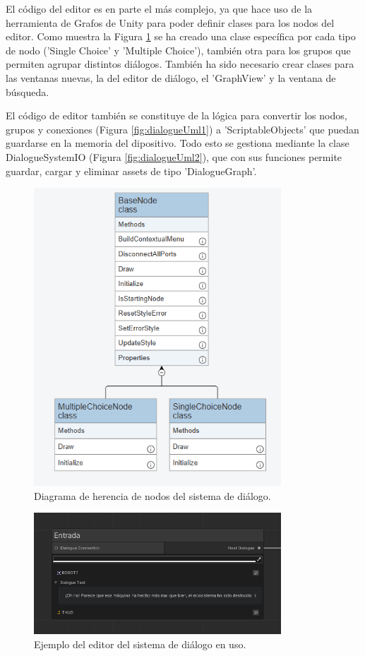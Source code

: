 El código del editor es en parte el más complejo, ya que hace uso de la herramienta de Grafos de Unity para poder definir clases para los nodos del editor. Como muestra la 
Figura \ref{fig:nodos} se ha creado una clase específica por cada tipo de nodo ('Single Choice' y 'Multiple Choice'), también otra para los grupos que permiten agrupar distintos 
diálogos. También ha sido necesario crear clases para las ventanas nuevas, la del editor de diálogo, el 'GraphView' y la ventana de búsqueda.

El código de editor también se constituye de la lógica para convertir los nodos, grupos y conexiones (Figura \ref{fig:dialogueUml1}) a 'ScriptableObjects' que puedan guardarse en la memoria del dipositivo. Todo esto se gestiona mediante la clase
DialogueSystemIO (Figura \ref{fig:dialogueUml2}), que con sus funciones permite guardar, cargar y eliminar assets de tipo 'DialogueGraph'.  

\begin{figure}[H]
  \centering
    \includegraphics[width=350px,clip=true]{Node_Herencia.png}
  \caption{Diagrama de herencia de nodos del sistema de diálogo.}
  \label{fig:nodos}
\end{figure}

\begin{figure}[H]
  \centering
    \includegraphics[width=350px,clip=true]{dialogue.png}
  \caption{Ejemplo del editor del sistema de diálogo en uso.}
  \label{fig:dialogueEditorExample}
\end{figure}

